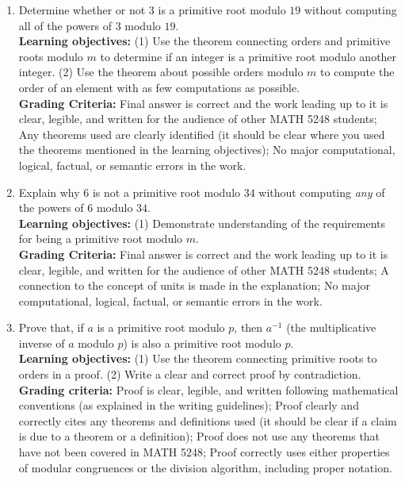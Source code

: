 \documentclass[12pt]{article}
\begin{document}
\begin{enumerate}


\item Determine whether or not $3$ is a primitive root modulo $19$ without computing all of the powers of $3$ modulo $19$. \\
{\bf Learning objectives:} (1) Use the theorem connecting orders and primitive roots modulo $m$ to determine if an integer is a primitive root modulo another integer. (2) Use the theorem about possible orders modulo $m$ to compute the order of an element with as few computations as possible.\\
{\bf Grading Criteria:} Final answer is correct and the work leading up to it is clear, legible, and written for the audience of other MATH 5248 students; Any theorems used are clearly identified (it should be clear where you used the theorems mentioned in the learning objectives); No major computational, logical, factual, or semantic errors in the work.

\item Explain why $6$ is not a primitive root modulo $34$ without computing \emph{any} of the powers of $6$ modulo $34$. \\
{\bf Learning objectives:} (1) Demonstrate understanding of the requirements for being a primitive root modulo $m$.\\
{\bf Grading Criteria:} Final answer is correct and the work leading up to it is clear, legible, and written for the audience of other MATH 5248 students; A connection to the concept of units is made in the explanation; No major computational, logical, factual, or semantic errors in the work.  

\item Prove that, if $a$ is a primitive root modulo $p$, then $a^{-1}$ (the multiplicative inverse of $a$ modulo $p$) is also a primitive root modulo $p$. \\
{\bf Learning objectives:} (1) Use the theorem connecting primitive roots to orders in a proof.  (2) Write a clear and correct proof by contradiction. \\
{\bf Grading criteria:} Proof is clear, legible, and written following mathematical conventions (as explained in the writing guidelines); Proof clearly and correctly cites any theorems and definitions used (it should be clear if a claim is due to a theorem or a definition); Proof does not use any theorems that have not been covered in MATH 5248; Proof correctly uses either properties of modular congruences or the division algorithm, including proper notation.



\end{enumerate}
\end{document}
